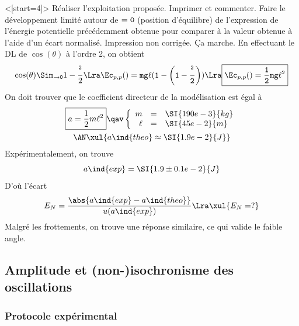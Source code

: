 \documentclass[../main/main.tex]{subfiles}
\begin{document}
\QR<[start=4]>{%
	Réaliser l'exploitation proposée. Imprimer et commenter. Faire le
	développement limité autour de $\tt=0$ (position d'équilibre) de l'expression
	de l'énergie potentielle précédemment obtenue pour comparer à la valeur
	obtenue à l'aide d'un écart normalisé.
}{%
	Impression non corrigée. Ça marche. En effectuant le DL de $\cos(\theta)$ à
	l'ordre 2, on obtient
	\[
		\cos(\theta) \Sim_{\tt \to 0} 1 - \frac{\tt^{2}}{2}
		\Lra
		\Ec_{p,p}(\tt) = mg \ell(1 - \left( 1 - \frac{\tt^{2}}{2} \right))
		\Lra
		\boxed{\Ec_{p,p}(\tt) = \frac{1}{2}mg \ell \tt^{2}}
	\]
	On doit trouver que le coefficient directeur de la modélisation est égal à
	\begin{gather*}
		\boxed{a = \frac{1}{2}m \ell^{2}}
		\qav
		\left\{
		\begin{array}{rcl}
			m    & = & \SI{190e-3}{kg}
			\\
			\ell & = & \SI{45e-2}{m}
		\end{array}
		\right.\\
		\AN
		\xul{
			a\ind{theo} \approx \SI{1.9e-2}{J}
		}
	\end{gather*}
	Expérimentalement, on trouve
	\[
		a\ind{exp} = \SI{1.9\pm0.1e-2}{J}
	\]
	D'où l'écart
	\[
		E_N = \frac{\abs{a\ind{exp} - a\ind{theo}}}{u(a\ind{exp})}
		\Lra
		\xul{E_N = ?}
	\]
	Malgré les frottements, on trouve une réponse similaire, ce qui valide le
	faible angle.
}

\subsection{Amplitude et (non-)isochronisme des oscillations}

\subsubsection{Protocole expérimental}


\end{document}
